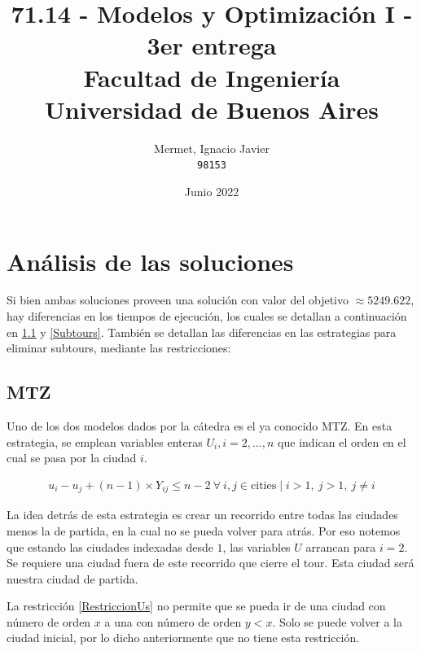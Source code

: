 \documentclass[titlepage,a4paper,oneside]{article}
\begin{document}
\begin{titlepage}
\title{
	71.14 \-- Modelos y Optimización I \-- 3er entrega\\
    \large Facultad de Ingeniería\\
	Universidad de Buenos Aires
}
\author{
	Mermet, Ignacio Javier\\
	\texttt{98153}
}
\date{Junio 2022}

\maketitle

\end{titlepage}

\tableofcontents

\newpage

\section{Análisis de las soluciones}
Si bien ambas soluciones proveen una solución con valor del objetivo $\approx 5249.622$, hay diferencias en los tiempos de ejecución, los cuales se detallan a continuación en \ref{MTZ} y \ref{Subtours}. También se detallan las diferencias en las estrategias para eliminar subtours, mediante las restricciones:

\subsection{MTZ}\label{MTZ}
Uno de los dos modelos dados por la cátedra es el ya conocido MTZ. En esta estrategia, se emplean variables enteras $U_i, i=2,\ldots,n$ que indican el orden en el cual se pasa por la ciudad $i$.

\begin{align}\label{RestriccionUs}
	u_i - u_j + \left(n-1\right) \times Y_{ij} \leq n - 2~\forall~i,j \in \text{cities} \mid i > 1,~j > 1,~j \neq i
\end{align}

La idea detrás de esta estrategia es crear un recorrido entre todas las ciudades menos la de partida, en la cual no se pueda volver para atrás. Por eso notemos que estando las ciudades indexadas desde $1$, las variables $U$ arrancan para $i=2$. Se requiere una ciudad fuera de este recorrido que cierre el tour. Esta ciudad será nuestra ciudad de partida.

La restricción \ref{RestriccionUs} no permite que se pueda ir de una ciudad con número de orden $x$ a una con número de orden $y < x$. Solo se puede volver a la ciudad inicial, por lo dicho anteriormente que no tiene esta restricción.
\end{document}
